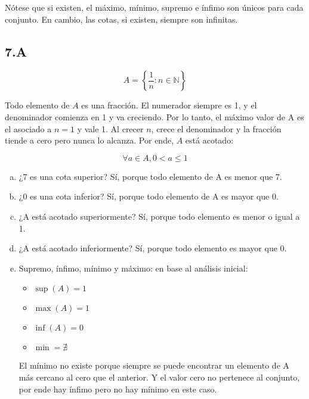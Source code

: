 \documentclass{article}
\newcommand{\subsectionx}[1]{\subsection*{#1}\label{subsec:#1}\addcontentsline{toc}{subsection}{\nameref{subsec:#1}}}
\begin{document}
Nótese que si existen, el máximo, mínimo, supremo e ínfimo son únicos para cada conjunto. En cambio, las cotas, si existen, siempre son infinitas.

\subsectionx{7.A}

\begin{equation}
A = \left\{ \frac{1}{n} : n \in \mathbb{N} \right\}
\end{equation}

Todo elemento de $ A $ es una fracción. El numerador siempre es 1, y el denominador comienza en 1 y va creciendo. Por lo tanto, el máximo valor de A es el asociado a $ n = 1 $ y vale 1. Al crecer $ n $, crece el denominador y la fracción tiende a cero pero nunca lo alcanza. Por ende, $ A $ está acotado:

\begin{equation}
\forall a \in A, 0 < a \le 1
\end{equation}

\begin{enumerate}[(a)]

\item ¿7 es una cota superior? Sí, porque todo elemento de A es menor que 7.

\item ¿0 es una cota inferior? Sí, porque todo elemento de A es mayor que 0.

\item ¿A está acotado superiormente? Sí, porque todo elemento es menor o igual a 1.

\item ¿A está acotado inferiormente? Sí, porque todo elemento es mayor que 0.

\item Supremo, ínfimo, mínimo y máximo: en base al análisis inicial:

\begin{itemize}

\item $ \mathop{sup}(A) = 1 $

\item $ \mathop{max}(A) = 1 $

\item $ \mathop{inf}(A) = 0 $

\item $ \mathop{min(A)} = \nexists $
 
\end{itemize}

El mínimo no existe porque siempre se puede encontrar un elemento de A más cercano al cero que el anterior. Y el valor cero no pertenece al conjunto, por ende hay ínfimo pero no hay mínimo en este caso.

\end{enumerate}
\end{document}
